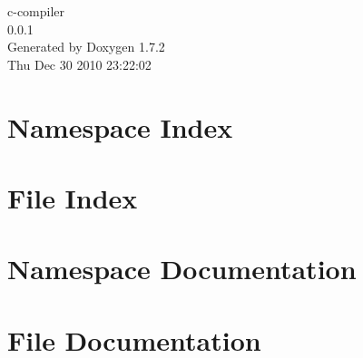 \documentclass[a4paper]{book}
\begin{document}
\hypersetup{pageanchor=false}
\begin{titlepage}
\vspace*{7cm}
\begin{center}
{\Large c-\/compiler \\[1ex]\large 0.0.1 }\\
\vspace*{1cm}
{\large Generated by Doxygen 1.7.2}\\
\vspace*{0.5cm}
{\small Thu Dec 30 2010 23:22:02}\\
\end{center}
\end{titlepage}
\clearemptydoublepage
{}
\tableofcontents
\clearemptydoublepage
{}
\hypersetup{pageanchor=true}
\chapter{Namespace Index}

\chapter{File Index}

\chapter{Namespace Documentation}

\chapter{File Documentation}

















\printindex
\end{document}

